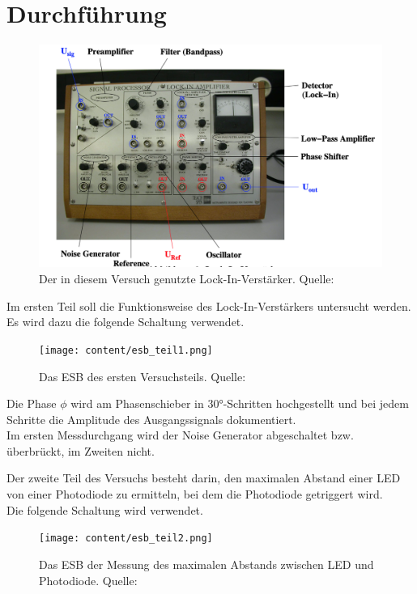 \section{Durchführung}
\label{sec:Durchführung}

\begin{figure}[H]
    \centering
    \includegraphics[scale=0.5]{content/lock_in_gerät.png}
    \caption{Der in diesem Versuch genutzte Lock-In-Verstärker. Quelle:\cite{sample}}
    \label{fig:Prinzip_lock_in}
\end{figure}


Im ersten Teil soll die Funktionsweise des Lock-In-Verstärkers untersucht werden.\\

Es wird dazu die folgende Schaltung verwendet.

\begin{figure}[H]
    \centering
    \texttt{[image: content/esb\_teil1.png]}
    \caption{Das ESB des ersten Versuchsteils. Quelle:\cite{sample}}
    \label{fig:Prinzip_lock_in}
\end{figure}

Die Phase $\phi$ wird am Phasenschieber in 30°-Schritten hochgestellt und bei jedem Schritte
die Amplitude des Ausgangssignals dokumentiert.\\

Im ersten Messdurchgang wird der Noise Generator abgeschaltet bzw. überbrückt, im Zweiten nicht.

Der zweite Teil des Versuchs besteht darin, den maximalen Abstand
einer LED von einer Photodiode zu ermitteln, bei dem die Photodiode getriggert wird.\\
Die folgende Schaltung wird verwendet.

\begin{figure}[H]
    \centering
    \texttt{[image: content/esb\_teil2.png]}
    \caption{Das ESB der Messung des maximalen Abstands zwischen LED und Photodiode. Quelle:\cite{sample}}
    \label{fig:Prinzip_led}
\end{figure}

